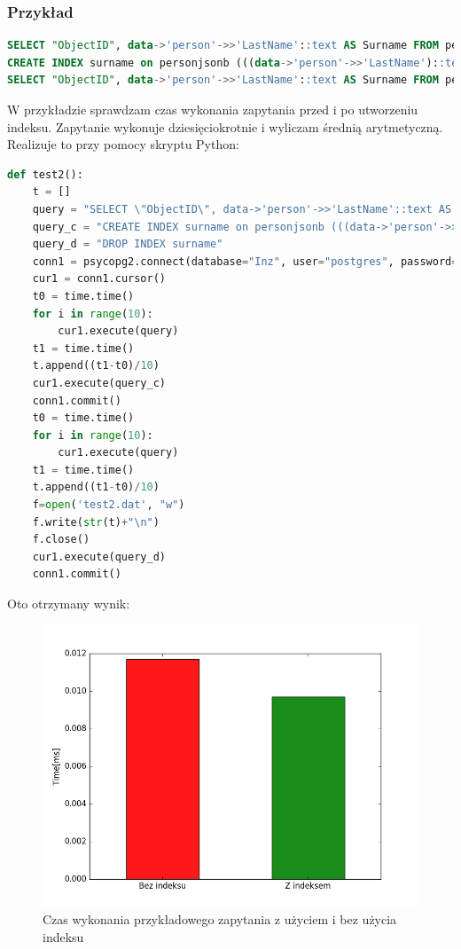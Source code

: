 \documentclass[a4paper,12pt,table]{article}
\begin{document}
{\subsubsection*{Przykład}
\begin{lstlisting}[language=SQL,basicstyle=\footnotesize]
SELECT "ObjectID", data->'person'->>'LastName'::text AS Surname FROM personjsonb WHERE data->'person'->>'LastName'::text LIKE 'T%';
CREATE INDEX surname on personjsonb (((data->'person'->>'LastName')::text));
SELECT "ObjectID", data->'person'->>'LastName'::text AS Surname FROM personjsonb WHERE data->'person'->>'LastName'::text LIKE 'T%';
\end{lstlisting}
\vspace{0.5cm}
W przykładzie sprawdzam czas wykonania zapytania przed i po utworzeniu indeksu. Zapytanie wykonuje dziesięciokrotnie i wyliczam średnią arytmetyczną. Realizuje to przy pomocy skryptu Python:
\begin{lstlisting}[language=Python,basicstyle=\footnotesize]
def test2():
	t = []
	query = "SELECT \"ObjectID\", data->'person'->>'LastName'::text AS Surname FROM personjsonb WHERE data->'person'->>'LastName'::text LIKE 'T%';"
	query_c = "CREATE INDEX surname on personjsonb (((data->'person'->>'LastName')::text));"
	query_d = "DROP INDEX surname"
	conn1 = psycopg2.connect(database="Inz", user="postgres", password="Password", host="127.0.0.1", port="5433")
	cur1 = conn1.cursor()
	t0 = time.time()
	for i in range(10):
		cur1.execute(query)
	t1 = time.time()
	t.append((t1-t0)/10)
	cur1.execute(query_c)
	conn1.commit()
	t0 = time.time()
	for i in range(10):
		cur1.execute(query)
	t1 = time.time()
	t.append((t1-t0)/10)
	f=open('test2.dat', "w")
	f.write(str(t)+"\n")
	f.close()
	cur1.execute(query_d)
	conn1.commit()
\end{lstlisting}
\vspace{0.5cm} \newpage
Oto otrzymany wynik:
\begin{figure}[h]
\begin{center}
\includegraphics[scale=0.7]{ax/figindex}
\end{center}
\caption{Czas wykonania przykładowego zapytania z użyciem i bez użycia indeksu}
\end{figure}

}
\end{document}
